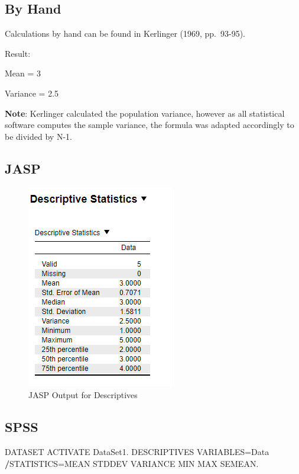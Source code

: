 \documentclass[
]{book}
\newenvironment{Shaded}{\begin{snugshade}}{\end{snugshade}}
\newcommand{\NormalTok}[1]{#1}
\newcommand{\OperatorTok}[1]{\textcolor[rgb]{0.81,0.36,0.00}{\textbf{#1}}}
\begin{document}
\hypertarget{by-hand}{%
\subsection{By Hand}\label{by-hand}}

Calculations by hand can be found in Kerlinger (1969, pp.~93-95).

Result:

Mean = 3

Variance = 2.5

\textbf{Note}: Kerlinger calculated the population variance, however as all statistical software computes the sample variance, the formula was adapted accordingly to be divided by N-1.

\hypertarget{jasp}{%
\subsection{JASP}\label{jasp}}

\begin{figure}[!h]
\includegraphics{Screenshots/Descriptives/DescriptivesJASP} \caption{\label{fig:descJASP}JASP Output for Descriptives}\label{fig:descJASP}
\end{figure}

\hypertarget{spss}{%
\subsection{SPSS}\label{spss}}

\begin{Shaded}
\begin{Highlighting}[]
\NormalTok{DATASET ACTIVATE DataSet1.}
\NormalTok{DESCRIPTIVES VARIABLES=Data}
  \OperatorTok{/}\NormalTok{STATISTICS=MEAN STDDEV VARIANCE MIN MAX SEMEAN.}
\end{Highlighting}
\end{Shaded}
\end{document}
